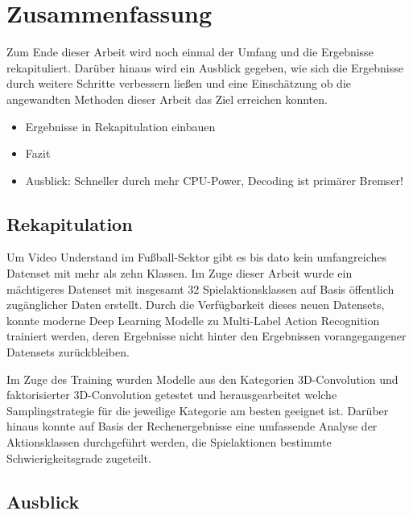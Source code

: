 \chapter{Zusammenfassung}
\label{ch:zusammenfassung}

Zum Ende dieser Arbeit wird noch einmal der Umfang und die Ergebnisse rekapituliert.
Darüber hinaus wird ein Ausblick gegeben, wie sich die Ergebnisse durch weitere Schritte verbessern ließen und eine Einschätzung ob die angewandten Methoden dieser Arbeit das Ziel erreichen konnten.

\begin{tcolorbox}[title=WIP]
 \begin{itemize}
  \item Ergebnisse in Rekapitulation einbauen
  \item Fazit
  \item Ausblick: Schneller durch mehr CPU-Power, Decoding ist primärer Bremser!
 \end{itemize}
 \end{tcolorbox}

\section{Rekapitulation}
\label{sec:rekapitulation}

Um Video Understand im Fußball-Sektor gibt es bis dato kein umfangreiches Datenset mit mehr als zehn Klassen.
Im Zuge dieser Arbeit wurde ein mächtigeres Datenset mit insgesamt 32 Spielaktionsklassen auf Basis öffentlich zugänglicher Daten erstellt.
Durch die Verfügbarkeit dieses neuen Datensets, konnte moderne Deep Learning Modelle zu Multi-Label Action Recognition trainiert werden, deren Ergebnisse nicht hinter den Ergebnissen vorangegangener Datensets zurückbleiben.

Im Zuge des Training wurden Modelle aus den Kategorien 3D-Convolution und faktorisierter 3D-Convolution getestet und herausgearbeitet welche Samplingstrategie für die jeweilige Kategorie am besten geeignet ist.
Darüber hinaus konnte auf Basis der Rechenergebnisse eine umfassende Analyse der Aktionsklassen durchgeführt werden, die Spielaktionen bestimmte Schwierigkeitsgrade zugeteilt.


\section{Ausblick}
\label{sec:ausblick}

